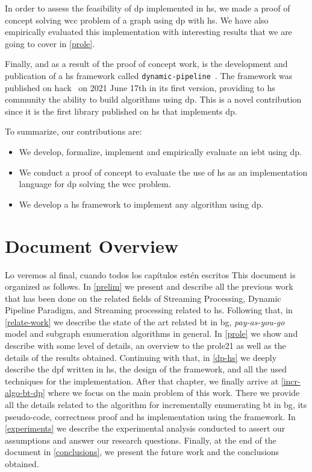 In order to assess the feasibility of \acrshort{dp} implemented in \acrshort{hs}, we made a proof of concept solving \acrfull{wcc} problem of a graph using \acrshort{dp} with \acrshort{hs}. We have also empirically evaluated this implementation with interesting results that we are going to cover in \autoref{prole}. 

Finally, and as a result of the proof of concept work, is the development and publication of a \acrshort{hs} framework called \texttt{dynamic-pipeline}~\cite{dynamic-pipeline}.  The framework was published on \acrfull{hack}~\cite{hackage} on 2021 June 17th in its first version,
providing to \acrshort{hs} community the ability to build algorithms using \acrshort{dp}. This is a novel contribution since it is the first library published on \acrshort{hs} that implements \acrshort{dp}.

To summarize, our contributions are:
\begin{itemize}
  \item We develop, formalize, implement and empirically evaluate an \acrlong{iebt} using \acrlong{dp}.
  \item We conduct a proof of concept to evaluate the use of \acrlong{hs} as an implementation language for \acrlong{dp} solving the \acrlong{wcc} problem.
  \item We develop a \acrshort{hs} framework to implement any algorithm using \acrlong{dp}.
\end{itemize}

\section{Document Overview} 
\color{red}
Lo veremos al final, cuando todos los capítulos estén escritos
\color{black}
This document is organized as follows. In \autoref{prelim} we present and describe all the previous work that has been done on the related fields of Streaming Processing, Dynamic Pipeline Paradigm, and Streaming processing related to \acrshort{hs}. 
Following that, in \autoref{relate-work} we describe the state of the art related \acrshort{bt} in \acrshort{bg}, \emph{pay-as-you-go} model and subgraph enumeration algorithms in general.
In \autoref{prole} we show and describe with some level of details, an overview to the \acrshort{prole21} as well as the details of the results obtained. 
Continuing with that, in \autoref{dp-hs} we deeply describe the \acrshort{dpf} written in \acrshort{hs}, the design of the framework, and all the used techniques for the implementation.
After that chapter, we finally arrive at \autoref{incr-algo-bt-dp} where we focus on the main problem of this work. There we provide all the details related to the algorithm for incrementally enumerating \acrshort{bt} in \acrshort{bg}, its pseudo-code,
correctness proof and \acrshort{hs} implementation using the framework.
In \autoref{experiments} we describe the experimental analysis conducted to assert our assumptions and answer our research questions.
Finally, at the end of the document in \autoref{conclusions}, we present the future work and the conclusions obtained.

